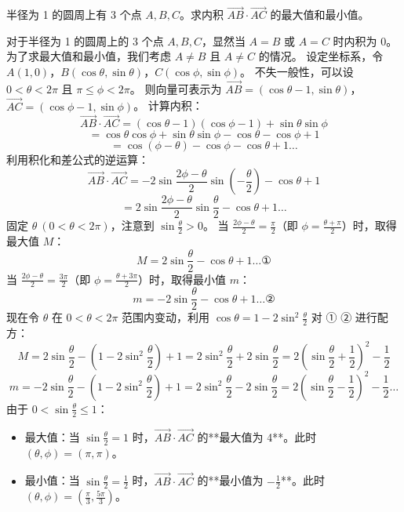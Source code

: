 \begin{questions}
\question 
半径为 1 的圆周上有 3 个点 $A, B, C$。求内积 $\vec{AB} \cdot \vec{AC}$ 的最大值和最小值。

\begin{solution}
    对于半径为 1 的圆周上的 3 个点 $A, B, C$，显然当 $A = B$ 或 $A = C$ 时内积为 0。
    为了求最大值和最小值，我们考虑 $A \ne B$ 且 $A \ne C$ 的情况。
    设定坐标系，令 $A(1, 0)$，$B(\cos \theta, \sin \theta)$，$C(\cos \phi, \sin \phi)$。
    不失一般性，可以设 $0 < \theta < 2\pi$ 且 $\pi \le \phi < 2\pi$。
    则向量可表示为 $\vec{AB} = (\cos \theta - 1, \sin \theta)$，$\vec{AC} = (\cos \phi - 1, \sin \phi)$。
    计算内积：
    \[
    \vec{AB} \cdot \vec{AC} = (\cos \theta - 1)(\cos \phi - 1) + \sin \theta \sin \phi
    \]
    \[
    = \cos \theta \cos \phi + \sin \theta \sin \phi - \cos \theta - \cos \phi + 1
    \]
    \[
    = \cos(\phi - \theta) - \cos \phi - \cos \theta + 1 \dots \text{}
    \]
    利用积化和差公式的逆运算：
    \[
    \vec{AB} \cdot \vec{AC} = -2 \sin \frac{2\phi - \theta}{2} \sin \left( -\frac{\theta}{2} \right) - \cos \theta + 1
    \]
    \[
    = 2 \sin \frac{2\phi - \theta}{2} \sin \frac{\theta}{2} - \cos \theta + 1 \dots \text{}
    \]
    固定 $\theta \ (0 < \theta < 2\pi)$，注意到 $\sin \frac{\theta}{2} > 0$。
    当 $\frac{2\phi - \theta}{2} = \frac{\pi}{2}$（即 $\phi = \frac{\theta + \pi}{2}$）时，取得最大值 $M$：
    \[
    M = 2 \sin \frac{\theta}{2} - \cos \theta + 1 \dots ① \text{}
    \]
    当 $\frac{2\phi - \theta}{2} = \frac{3\pi}{2}$（即 $\phi = \frac{\theta + 3\pi}{2}$）时，取得最小值 $m$：
    \[
    m = -2 \sin \frac{\theta}{2} - \cos \theta + 1 \dots ② \text{}
    \]
    现在令 $\theta$ 在 $0 < \theta < 2\pi$ 范围内变动，利用 $\cos \theta = 1 - 2 \sin^2 \frac{\theta}{2}$ 对 ① ② 进行配方：
    \[
    M = 2 \sin \frac{\theta}{2} - (1 - 2 \sin^2 \frac{\theta}{2}) + 1 = 2 \sin^2 \frac{\theta}{2} + 2 \sin \frac{\theta}{2} = 2 \left( \sin \frac{\theta}{2} + \frac{1}{2} \right)^2 - \frac{1}{2}
    \]
    \[
    m = -2 \sin \frac{\theta}{2} - (1 - 2 \sin^2 \frac{\theta}{2}) + 1 = 2 \sin^2 \frac{\theta}{2} - 2 \sin \frac{\theta}{2} = 2 \left( \sin \frac{\theta}{2} - \frac{1}{2} \right)^2 - \frac{1}{2} \dots \text{}
    \]
    由于 $0 < \sin \frac{\theta}{2} \le 1$：
    \begin{itemize}
        \item 最大值：当 $\sin \frac{\theta}{2} = 1$ 时，$\vec{AB} \cdot \vec{AC}$ 的**最大值为 4**。此时 $(\theta, \phi) = (\pi, \pi)$。
        \item 最小值：当 $\sin \frac{\theta}{2} = \frac{1}{2}$ 时，$\vec{AB} \cdot \vec{AC}$ 的**最小值为 $-\frac{1}{2}$**。此时 $(\theta, \phi) = (\frac{\pi}{3}, \frac{5\pi}{3})$。
    \end{itemize}
\end{solution}


\end{questions}
